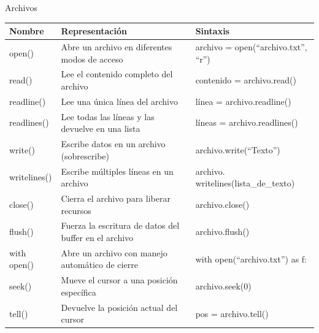 \documentclass[11pt]{beamer}
\begin{document}
\begin{frame}{Archivos}
	\scriptsize
	\begin{tabularx}{\linewidth}{
			>{\raggedright\arraybackslash}p{2cm}   %
			>{\raggedright\arraybackslash}X        %
			>{\raggedright\arraybackslash}X        %
		}
		\toprule
		\textbf{Nombre} & \textbf{Representación} & \textbf{Sintaxis} \\
		\midrule
		open() & Abre un archivo en diferentes modos de acceso & archivo = open(``archivo.txt'', ``r'') \\
		read() & Lee el contenido completo del archivo & contenido = archivo.read() \\
		readline() & Lee una única línea del archivo & línea = archivo.readline() \\
		readlines() & Lee todas las líneas y las devuelve en una lista & líneas = archivo.readlines() \\
		write() & Escribe datos en un archivo (sobrescribe) & archivo.write(``Texto'') \\
		writelines() & Escribe múltiples líneas en un archivo & archivo.
		writelines(lista\_de\_texto) \\
		close() & Cierra el archivo para liberar recursos & archivo.close() \\
		flush() & Fuerza la escritura de datos del buffer en el archivo & archivo.flush() \\
		with open() & Abre un archivo con manejo automático de cierre & with open(``archivo.txt'') as f: \\
		seek() & Mueve el cursor a una posición específica & archivo.seek(0) \\
		tell() & Devuelve la posición actual del cursor & pos = archivo.tell() \\
		\bottomrule 
	\end{tabularx}
\end{frame}
\end{document}
